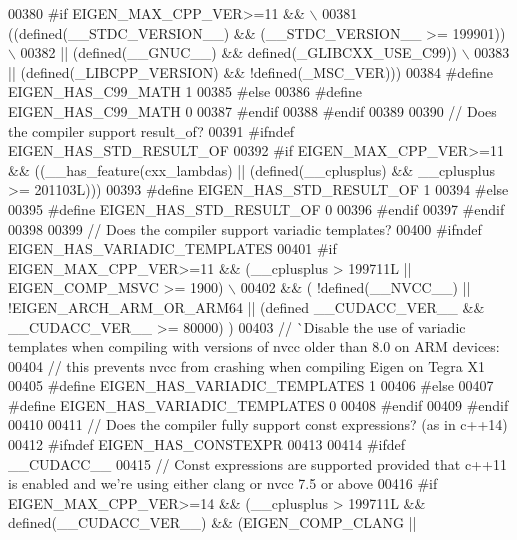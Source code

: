\begin{DoxyCode}
00380 \textcolor{preprocessor}{#if EIGEN\_MAX\_CPP\_VER>=11 && \(\backslash\)}
00381 \textcolor{preprocessor}{    ((defined(\_\_STDC\_VERSION\_\_) && (\_\_STDC\_VERSION\_\_ >= 199901))       \(\backslash\)}
00382 \textcolor{preprocessor}{  || (defined(\_\_GNUC\_\_) && defined(\_GLIBCXX\_USE\_C99)) \(\backslash\)}
00383 \textcolor{preprocessor}{  || (defined(\_LIBCPP\_VERSION) && !defined(\_MSC\_VER)))}
00384 \textcolor{preprocessor}{  #define EIGEN\_HAS\_C99\_MATH 1}
00385 \textcolor{preprocessor}{#else}
00386 \textcolor{preprocessor}{  #define EIGEN\_HAS\_C99\_MATH 0}
00387 \textcolor{preprocessor}{#endif}
00388 \textcolor{preprocessor}{#endif}
00389 
00390 \textcolor{comment}{// Does the compiler support result\_of?}
00391 \textcolor{preprocessor}{#ifndef EIGEN\_HAS\_STD\_RESULT\_OF}
00392 \textcolor{preprocessor}{#if EIGEN\_MAX\_CPP\_VER>=11 && ((\_\_has\_feature(cxx\_lambdas) || (defined(\_\_cplusplus) && \_\_cplusplus >=
       201103L)))}
00393 \textcolor{preprocessor}{#define EIGEN\_HAS\_STD\_RESULT\_OF 1}
00394 \textcolor{preprocessor}{#else}
00395 \textcolor{preprocessor}{#define EIGEN\_HAS\_STD\_RESULT\_OF 0}
00396 \textcolor{preprocessor}{#endif}
00397 \textcolor{preprocessor}{#endif}
00398 
00399 \textcolor{comment}{// Does the compiler support variadic templates?}
00400 \textcolor{preprocessor}{#ifndef EIGEN\_HAS\_VARIADIC\_TEMPLATES}
00401 \textcolor{preprocessor}{#if EIGEN\_MAX\_CPP\_VER>=11 && (\_\_cplusplus > 199711L || EIGEN\_COMP\_MSVC >= 1900) \(\backslash\)}
00402 \textcolor{preprocessor}{  && ( !defined(\_\_NVCC\_\_) || !EIGEN\_ARCH\_ARM\_OR\_ARM64 || (defined \_\_CUDACC\_VER\_\_ && \_\_CUDACC\_VER\_\_ >=
       80000) )}
00403     \textcolor{comment}{// ^^ Disable the use of variadic templates when compiling with versions of nvcc older than 8.0 on ARM
       devices:}
00404     \textcolor{comment}{//    this prevents nvcc from crashing when compiling Eigen on Tegra X1}
00405 \textcolor{preprocessor}{#define EIGEN\_HAS\_VARIADIC\_TEMPLATES 1}
00406 \textcolor{preprocessor}{#else}
00407 \textcolor{preprocessor}{#define EIGEN\_HAS\_VARIADIC\_TEMPLATES 0}
00408 \textcolor{preprocessor}{#endif}
00409 \textcolor{preprocessor}{#endif}
00410 
00411 \textcolor{comment}{// Does the compiler fully support const expressions? (as in c++14)}
00412 \textcolor{preprocessor}{#ifndef EIGEN\_HAS\_CONSTEXPR}
00413 
00414 \textcolor{preprocessor}{#ifdef \_\_CUDACC\_\_}
00415 \textcolor{comment}{// Const expressions are supported provided that c++11 is enabled and we're using either clang or nvcc 7.5
       or above}
00416 \textcolor{preprocessor}{#if EIGEN\_MAX\_CPP\_VER>=14 && (\_\_cplusplus > 199711L && defined(\_\_CUDACC\_VER\_\_) && (EIGEN\_COMP\_CLANG ||
}
\end{DoxyCode}
